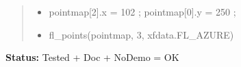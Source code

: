 \begin{boxedminipage}{\funcwidth}
\begin{quote}
\begin{itemize}
  \item pointmap[2].x = 102 ; pointmap[0].y = 250 ;



  \item fl\_points(pointmap, 3, xfdata.FL\_AZURE)



\end{itemize}

\end{quote}

\textbf{Status:} Tested + Doc + NoDemo = OK



    \end{boxedminipage}

    \label{xformslib:flxbasic:fl_dashedlinestyle}

    \vspace{0.5ex}

